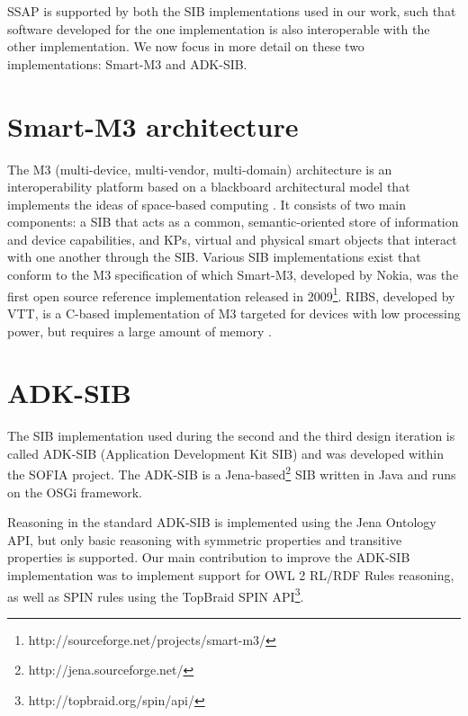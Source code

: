 \ac{SSAP} is supported by both the \ac{SIB} implementations used in our work, such that software developed for the one implementation is also interoperable with the other implementation. We now focus in more detail on these two implementations: Smart-M3 and ADK-SIB.


\section{Smart-M3 architecture}
\label{m3}
The M3 (multi-device, multi-vendor, multi-domain) architecture is an interoperability platform based on a blackboard architectural model that implements the ideas of space-based computing \cite{Honkola2010}. It consists of two main components: a \ac{SIB} that acts as a common, semantic-oriented store of information and device capabilities, and \acp{KP}, virtual and physical smart objects that interact with one another through the \ac{SIB}. Various \ac{SIB} implementations exist that conform to the M3 specification of which Smart-M3, developed by Nokia, was the first open source reference implementation released in 2009\footnote{http://sourceforge.net/projects/smart-m3/}. \ac{RIBS}, developed by VTT, is a C-based implementation of M3 targeted for devices with low processing power, but requires a large amount of memory \cite{Etelapera2011}.  


\section{ADK-SIB}

The \ac{SIB} implementation used during the second and the third design iteration is called ADK-SIB (Application Development Kit SIB) and was developed within the \ac{SOFIA} project. The ADK-SIB is a Jena-based\footnote{http://jena.sourceforge.net/} \ac{SIB} written in Java and runs on the \ac{OSGi} framework.

Reasoning in the standard ADK-SIB is implemented using the Jena Ontology API, but only basic reasoning with symmetric properties and transitive properties is supported. Our main contribution to improve the ADK-SIB implementation was to implement support for OWL 2 RL/RDF Rules reasoning, as well as \ac{SPIN} rules using the TopBraid \ac{SPIN} API\footnote{http://topbraid.org/spin/api/}.

